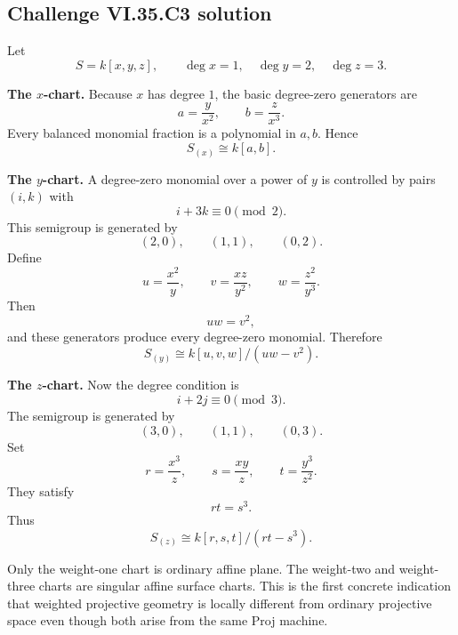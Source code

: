 \subsection*{Challenge VI.35.C3 solution}
\begin{solution}
Let
\[
S=k[x,y,z],
\qquad
\deg x=1,\quad \deg y=2,\quad \deg z=3.
\]

\textbf{The \(x\)-chart.}
Because \(x\) has degree \(1\), the basic degree-zero generators are
\[
a=\frac y{x^2},
\qquad
b=\frac z{x^3}.
\]
Every balanced monomial fraction is a polynomial in \(a,b\). Hence
\[
\boxed{S_{(x)}\cong k[a,b]}.
\]

\textbf{The \(y\)-chart.}
A degree-zero monomial over a power of \(y\) is controlled by pairs \((i,k)\) with
\[
i+3k\equiv0\pmod2.
\]
This semigroup is generated by
\[
(2,0),\qquad(1,1),\qquad(0,2).
\]
Define
\[
u=\frac{x^2}{y},
\qquad
v=\frac{xz}{y^2},
\qquad
w=\frac{z^2}{y^3}.
\]
Then
\[
uw=v^2,
\]
and these generators produce every degree-zero monomial. Therefore
\[
\boxed{
S_{(y)}
\cong
k[u,v,w]/(uw-v^2).
}
\]

\textbf{The \(z\)-chart.}
Now the degree condition is
\[
i+2j\equiv0\pmod3.
\]
The semigroup is generated by
\[
(3,0),\qquad(1,1),\qquad(0,3).
\]
Set
\[
r=\frac{x^3}{z},
\qquad
s=\frac{xy}{z},
\qquad
t=\frac{y^3}{z^2}.
\]
They satisfy
\[
rt=s^3.
\]
Thus
\[
\boxed{
S_{(z)}
\cong
k[r,s,t]/(rt-s^3).
}
\]

Only the weight-one chart is ordinary affine plane.  The weight-two and weight-three charts are singular affine
surface charts.  This is the first concrete indication that weighted projective geometry is locally different from
ordinary projective space even though both arise from the same Proj machine.
\end{solution}

